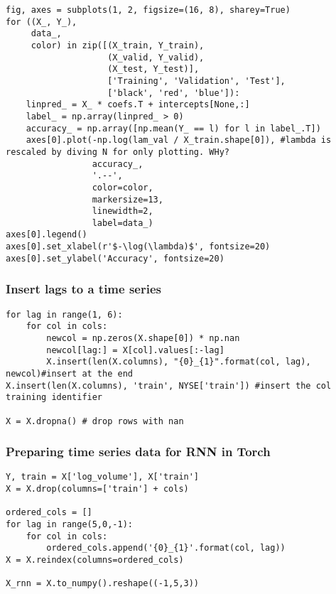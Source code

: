 \documentclass[
  letterpaper,
  DIV=11,
  numbers=noendperiod]{scrreprt}
\begin{document}
\begin{verbatim}
fig, axes = subplots(1, 2, figsize=(16, 8), sharey=True)
for ((X_, Y_),
     data_,
     color) in zip([(X_train, Y_train),
                    (X_valid, Y_valid),
                    (X_test, Y_test)],
                    ['Training', 'Validation', 'Test'],
                    ['black', 'red', 'blue']):
    linpred_ = X_ * coefs.T + intercepts[None,:]
    label_ = np.array(linpred_ > 0)
    accuracy_ = np.array([np.mean(Y_ == l) for l in label_.T])
    axes[0].plot(-np.log(lam_val / X_train.shape[0]), #lambda is rescaled by diving N for only plotting. WHy?
                 accuracy_,
                 '.--',
                 color=color,
                 markersize=13,
                 linewidth=2,
                 label=data_)
axes[0].legend()
axes[0].set_xlabel(r'$-\log(\lambda)$', fontsize=20)
axes[0].set_ylabel('Accuracy', fontsize=20)
\end{verbatim}

\subsubsection{Insert lags to a time
series}\label{insert-lags-to-a-time-series}

\begin{verbatim}
for lag in range(1, 6):
    for col in cols:
        newcol = np.zeros(X.shape[0]) * np.nan
        newcol[lag:] = X[col].values[:-lag]
        X.insert(len(X.columns), "{0}_{1}".format(col, lag), newcol)#insert at the end
X.insert(len(X.columns), 'train', NYSE['train']) #insert the col training identifier 

X = X.dropna() # drop rows with nan
\end{verbatim}

\subsubsection{Preparing time series data for RNN in
Torch}\label{preparing-time-series-data-for-rnn-in-torch}

\begin{verbatim}
Y, train = X['log_volume'], X['train']
X = X.drop(columns=['train'] + cols)

ordered_cols = []
for lag in range(5,0,-1):
    for col in cols:
        ordered_cols.append('{0}_{1}'.format(col, lag))
X = X.reindex(columns=ordered_cols)

X_rnn = X.to_numpy().reshape((-1,5,3))


\end{verbatim}
\end{document}
